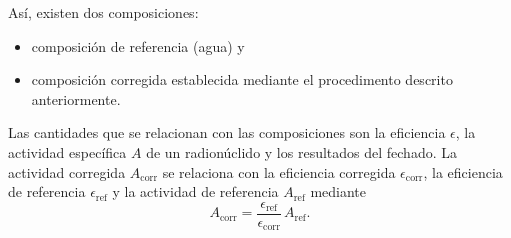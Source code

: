 Así, existen dos composiciones: 
\begin{itemize}
\item composición de referencia (agua) y 
\item composición corregida establecida mediante el procedimento descrito anteriormente. 
\end{itemize}
Las cantidades que se relacionan con las composiciones son la eficiencia $\epsilon$, la actividad específica $A$ de un radionúclido y los resultados del fechado. La actividad corregida $A_\text{corr}$ se relaciona con la eficiencia corregida $\epsilon_{\text{corr}}$, la eficiencia de referencia $\epsilon_\text{ref}$ y la actividad de referencia $A_\text{ref}$ mediante
\begin{equation}\label{Eq-ActividadCorregida}
A_\text{corr} = \dfrac{\epsilon_\text{ref}}{\epsilon_{\text{corr}}}\,A_\text{ref}.
\end{equation}
